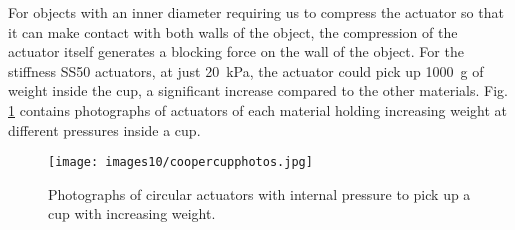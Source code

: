 For objects with an inner diameter requiring us to compress the actuator so that it can make contact with both walls of the object, the compression of the actuator itself generates a blocking force on the wall of the object. For the stiffness SS50 actuators, at just 20~kPa, the actuator could pick up 1000~g of weight inside the cup, a significant increase compared to the other materials. Fig. \ref{fig:coopercupphotos} contains photographs of actuators of each material holding increasing weight at different pressures inside a cup. 
\\
\begin{figure}[!ht]
    \centering
     \texttt{[image: images10/coopercupphotos.jpg]}
    \caption{Photographs of circular actuators with internal pressure to pick up a cup with increasing weight.}
    \label{fig:coopercupphotos}
\end{figure}